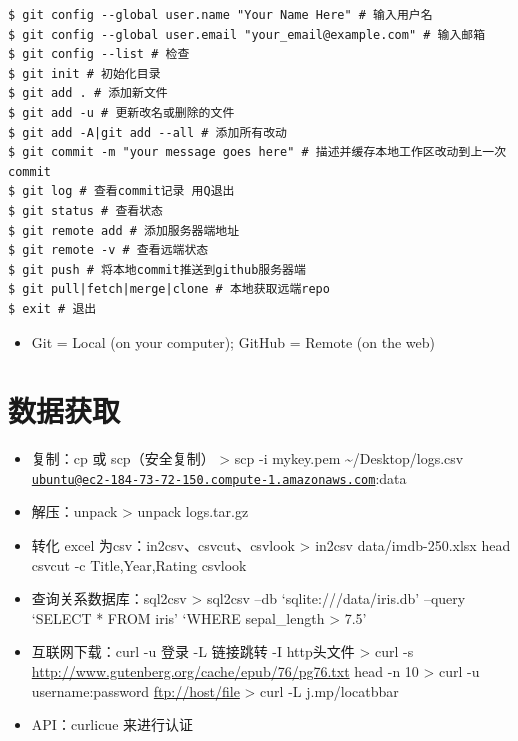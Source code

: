 \documentclass[]{book}
\providecommand{\tightlist}{%
  \setlength{\itemsep}{0pt}\setlength{\parskip}{0pt}}
\begin{document}
\begin{verbatim}
$ git config --global user.name "Your Name Here" # 输入用户名
$ git config --global user.email "your_email@example.com" # 输入邮箱
$ git config --list # 检查
$ git init # 初始化目录
$ git add . # 添加新文件
$ git add -u # 更新改名或删除的文件
$ git add -A|git add --all # 添加所有改动
$ git commit -m "your message goes here" # 描述并缓存本地工作区改动到上一次commit
$ git log # 查看commit记录 用Q退出
$ git status # 查看状态
$ git remote add # 添加服务器端地址
$ git remote -v # 查看远端状态
$ git push # 将本地commit推送到github服务器端
$ git pull|fetch|merge|clone # 本地获取远端repo
$ exit # 退出
\end{verbatim}

\begin{itemize}
\tightlist
\item
  Git = Local (on your computer); GitHub = Remote (on the web)
\end{itemize}

\hypertarget{ux6570ux636eux83b7ux53d6}{%
\section{数据获取}\label{ux6570ux636eux83b7ux53d6}}

\begin{itemize}
\item
  复制：cp 或 scp（安全复制）
  \textgreater{} scp -i mykey.pem \textasciitilde{}/Desktop/logs.csv \href{mailto:ubuntu@ec2-184-73-72-150.compute-1.amazonaws.com}{\nolinkurl{ubuntu@ec2-184-73-72-150.compute-1.amazonaws.com}}:data
\item
  解压：unpack
  \textgreater{} unpack logs.tar.gz
\item
  转化 excel 为csv：in2csv、csvcut、csvlook
  \textgreater{} in2csv data/imdb-250.xlsx \textbar{} head \textbar{} csvcut -c Title,Year,Rating \textbar{} csvlook
\item
  查询关系数据库：sql2csv
  \textgreater{} sql2csv --db `sqlite:///data/iris.db' --query `SELECT * FROM iris' `WHERE sepal\_length \textgreater{} 7.5'
\item
  互联网下载：curl -u 登录 -L 链接跳转 -I http头文件
  \textgreater{} curl -s \url{http://www.gutenberg.org/cache/epub/76/pg76.txt} \textbar{} head -n 10
  \textgreater{} curl -u username:password \url{ftp://host/file}
  \textgreater{} curl -L j.mp/locatbbar
\item
  API：curlicue 来进行认证
\end{itemize}
\end{document}
